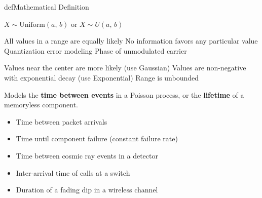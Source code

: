 \begin{PSbox}[unbreakable]{def}{Mathematical Definition}

$X \sim \mathrm{Uniform}(a,\, b)$ or $X \sim U(a,\, b)$

\end{PSbox}










\PSyes{} All values in a range are equally likely\PSbr{}\PSyes{} No information favors any particular value\PSbr{}\PSyes{} Quantization error modeling\PSbr{}\PSyes{} Phase of unmodulated carrier


\PSno{} Values near the center are more likely (use Gaussian)\PSbr{}\PSno{} Values are non-negative with exponential decay (use Exponential)\PSbr{}\PSno{} Range is unbounded



Models the \textbf{time between events} in a Poisson process, or the \textbf{lifetime} of a memoryless component.


\begin{itemize}
\tightlist
\item
  Time between packet arrivals
\item
  Time until component failure (constant failure rate)
\item
  Time between cosmic ray events in a detector
\item
  Inter-arrival time of calls at a switch
\item
  Duration of a fading dip in a wireless channel
\end{itemize}

